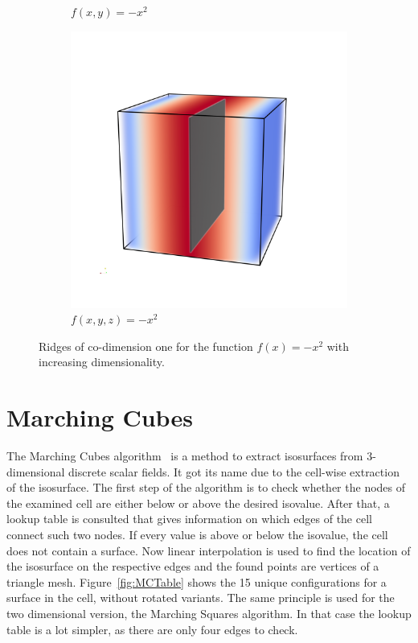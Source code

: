 \begin{figure}
\begin{subfigure}[b]{0.33\textwidth}
    \caption{$f(x,y)= -x^2$}
    \label{fig:ridge2D}
  \end{subfigure}
  \begin{subfigure}[b]{0.33\textwidth}
    \includegraphics[width=\textwidth]{Images/func3D.png}
    \caption{$f(x,y,z)= -x^2$}
    \label{fig:ridge3D}
  \end{subfigure}
  \caption{Ridges of co-dimension one for the function $f(x)=-x^2$ with
  increasing dimensionality.}
\end{figure}

\section{Marching Cubes}

The Marching Cubes algorithm~\cite{MC} is a method to extract
isosurfaces from 3-dimensional discrete scalar fields. It got its name
due to the cell-wise extraction of the isosurface. The first step of the
algorithm is to check whether the nodes of the examined cell are either
below or above the desired isovalue. After that, a lookup table is
consulted that gives information on which edges of the cell connect such
two nodes. If every value is above or below the isovalue, the cell does
not contain a surface. Now linear interpolation is used to find the
location of the isosurface on the respective edges and the found points
are vertices of a triangle mesh. Figure~\ref{fig:MCTable} shows the
15 unique configurations for a surface in the cell, without
rotated variants. The same principle is used for the two dimensional
version, the Marching Squares algorithm. In that case the lookup table
is a lot simpler, as there are only four edges to check.

